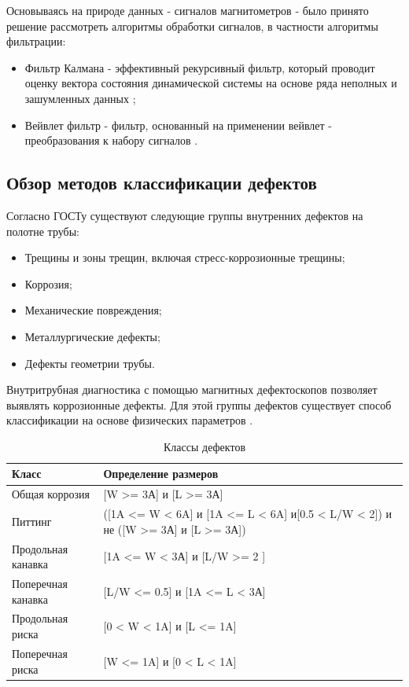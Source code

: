 \documentclass[a4paper,article,14pt]{extarticle}
\begin{document}
Основываясь на природе данных - сигналов магнитометров - было принято решение рассмотреть алгоритмы  обработки сигналов, в частности алгоритмы фильтрации:

\begin{itemize}
    \item Фильтр Калмана - эффективный рекурсивный фильтр, который проводит оценку вектора состояния динамической системы 
    на основе ряда неполных и зашумленных данных \cite{a11};
    \item Вейвлет фильтр - фильтр, основанный на применении вейвлет - преобразования к набору сигналов \cite{a12}.
\end{itemize}

\subsection{Обзор методов классификации дефектов}

Согласно ГОСТу \cite{g1} существуют следующие группы  внутренних дефектов на полотне трубы:

\begin{itemize}
    \item Трещины и зоны трещин, включая стресс-коррозионные трещины;
    \item Коррозия;
    \item Механические повреждения;
    \item Металлургические дефекты;
    \item Дефекты геометрии трубы.
\end{itemize}

Внутритрубная диагностика с помощью магнитных дефектоскопов позволяет выявлять коррозионные дефекты.
Для этой группы дефектов существует способ классификации на основе физических 
параметров \cite{g2}.

\begin{center}
    \begin{longtable}{|p{5cm}|p{7cm}|}
        \caption{Классы дефектов}\\\hline
        Класс & Определение размеров \\ \hline
        Общая коррозия & [W >= 3А] и [L >= 3А] \\ \hline
        Питтинг & ([1A <= W < 6A] и [1A <= L < 6A] и[0.5 < L/W < 2]) и не ([W >= 3А] и [L >= 3А]) \\ \hline
        Продольная канавка & [1A <= W < 3А] и [L/W >= 2 ] \\ \hline
        Поперечная канавка & [L/W <= 0.5] и [1A <= L < 3А] \\ \hline
        Продольная риска & [0 < W < 1A] и [L <= 1A] \\ \hline
        Поперечная риска & [W <= 1A] и [0 < L < 1A] \\ \hline
    \end{longtable}
\end{center}
\end{document}
